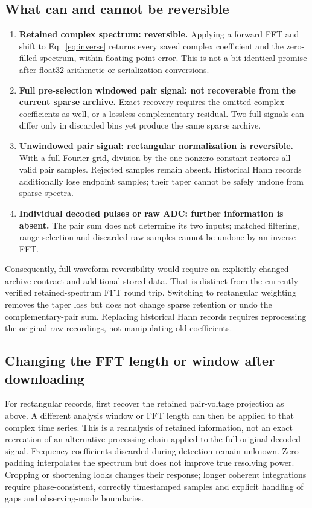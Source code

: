 \documentclass[11pt]{article}
\begin{document}
\clearpage
\subsection{What can and cannot be reversible}
\begin{enumerate}
\item \textbf{Retained complex spectrum: reversible.} Applying a forward FFT
and shift to Eq.~\eqref{eq:inverse} returns every saved complex coefficient
and the zero-filled spectrum, within floating-point error. This is not a
bit-identical promise after float32 arithmetic or serialization conversions.
\item \textbf{Full pre-selection windowed pair signal: not recoverable from
the current sparse archive.} Exact recovery requires the omitted complex
coefficients as well, or a lossless complementary residual. Two full signals
can differ only in discarded bins yet produce the same sparse archive.
\item \textbf{Unwindowed pair signal: rectangular normalization is reversible.}
With a full Fourier grid, division by the one nonzero constant restores all
valid pair samples. Rejected samples remain absent. Historical Hann records
additionally lose endpoint samples; their taper cannot be safely undone from
sparse spectra.
\item \textbf{Individual decoded pulses or raw ADC: further information is
absent.} The pair sum does not determine its two inputs; matched filtering,
range selection and discarded raw samples cannot be undone by an inverse FFT.
\end{enumerate}
Consequently, full-waveform reversibility would require an explicitly changed
archive contract and additional stored data. That is distinct from the
currently verified retained-spectrum FFT round trip. Switching to rectangular
weighting removes the taper loss but does not change sparse retention or undo
the complementary-pair sum. Replacing historical Hann records requires
reprocessing the original raw recordings, not manipulating old coefficients.

\subsection{Changing the FFT length or window after downloading}
For rectangular records, first recover the retained pair-voltage projection
as above. A different analysis window or FFT length can then be applied to
that complex time series. This is a reanalysis of retained information, not
an exact recreation of an alternative processing chain applied to the full
original decoded signal. Frequency coefficients discarded during detection
remain unknown. Zero-padding interpolates the spectrum but does not improve
true resolving power. Cropping or shortening looks changes their response;
longer coherent integrations require phase-consistent, correctly timestamped
samples and explicit handling of gaps and observing-mode boundaries.
\end{document}
